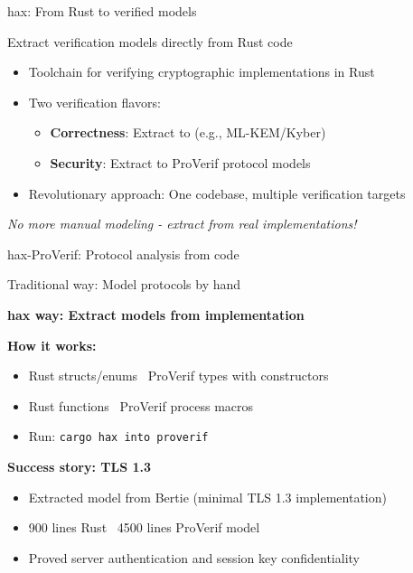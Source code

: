 \documentclass[aspectratio=169, lualatex, handout]{beamer}
\begin{document}
\begin{frame}{hax: From Rust to verified models}
	\begin{center}
		\Large
		Extract verification models directly from Rust code
	\end{center}
	\vspace{1em}
	\begin{itemize}
		\item Toolchain for verifying cryptographic implementations in Rust
		\item Two verification flavors:
		      \begin{itemize}
			      \item \textbf{Correctness}: Extract to \fstar (e.g., ML-KEM/Kyber)
			      \item \textbf{Security}: Extract to ProVerif protocol models
		      \end{itemize}
		\item Revolutionary approach: One codebase, multiple verification targets
	\end{itemize}
	\vspace{0.5em}
	\begin{center}
		\textit{No more manual modeling - extract from real implementations!}
	\end{center}
\end{frame}

\begin{frame}{hax-ProVerif: Protocol analysis from code}
	\begin{center}
		\Large
		Traditional way: Model protocols by hand

		\vspace{0.5em}

		\textbf{hax way: Extract models from implementation}
	\end{center}
	\vspace{1em}
	\textbf{How it works:}
	\begin{itemize}
		\item Rust structs/enums \rightarrow\ ProVerif types with constructors
		\item Rust functions \rightarrow\ ProVerif process macros
		\item Run: \texttt{cargo hax into proverif}
	\end{itemize}
	\vspace{0.5em}
	\textbf{Success story: TLS 1.3}
	\begin{itemize}
		\item Extracted model from Bertie (minimal TLS 1.3 implementation)
		\item 900 lines Rust \rightarrow\ 4500 lines ProVerif model
		\item Proved server authentication and session key confidentiality
	\end{itemize}
\end{frame}
\end{document}
